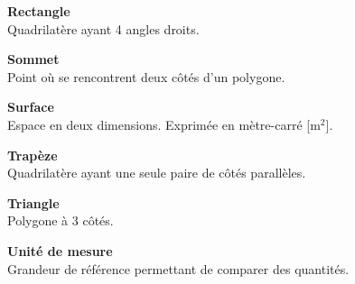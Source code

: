 \begin{tcbraster}[raster columns=2, raster equal height, raster valign=top,raster column skip=2mm, raster row skip=2mm]
\begin{terme}
\textbf{\large Rectangle}\\[2pt]
{\small Quadrilatère ayant 4 angles droits.}
\end{terme}
\begin{terme}
\textbf{\large Sommet}\\[2pt]
{\small Point où se rencontrent deux côtés d'un polygone.}
\end{terme}
\begin{terme}
\textbf{\large Surface}\\[2pt]
{\small Espace en deux dimensions. Exprimée en mètre-carré [m$^2$].}
\end{terme}
\begin{terme}
\textbf{\large Trapèze}\\[2pt]
{\small Quadrilatère ayant une seule paire de côtés parallèles.}
\end{terme}
\begin{terme}
\textbf{\large Triangle}\\[2pt]
{\small Polygone à 3 côtés.}
\end{terme}
\begin{terme}
\textbf{\large Unité de mesure}\\[2pt]
{\small Grandeur de référence permettant de comparer des quantités.}
\end{terme}
\end{tcbraster}